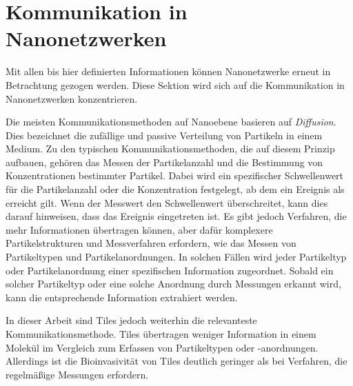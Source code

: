 \section{Kommunikation in Nanonetzwerken}

Mit allen bis hier definierten Informationen können Nanonetzwerke erneut in Betrachtung gezogen werden. Diese Sektion wird sich auf die Kommunikation in Nanonetzwerken konzentrieren.

Die meisten Kommunikationsmethoden auf Nanoebene basieren auf \emph{Diffusion}. Dies bezeichnet die zufällige und passive Verteilung von Partikeln in einem Medium. Zu den typischen Kommunikationsmethoden, die auf diesem Prinzip aufbauen, gehören das Messen der Partikelanzahl und die Bestimmung von Konzentrationen bestimmter Partikel.
Dabei wird ein spezifischer Schwellenwert für die Partikelanzahl oder die Konzentration festgelegt, ab dem ein Ereignis als erreicht gilt. 
Wenn der Messwert den Schwellenwert überschreitet, kann dies darauf hinweisen, dass das Ereignis eingetreten ist. Es gibt jedoch Verfahren, die mehr Informationen übertragen können, aber dafür komplexere Partikelstrukturen und Messverfahren erfordern, wie das Messen von Partikeltypen und Partikelanordnungen. In solchen Fällen wird jeder Partikeltyp oder Partikelanordnung einer spezifischen Information zugeordnet. Sobald ein solcher Partikeltyp oder eine solche Anordnung durch Messungen erkannt wird, kann die entsprechende Information extrahiert werden.

In dieser Arbeit sind Tiles jedoch weiterhin die relevanteste Kommunikationsmethode. Tiles übertragen weniger Information in einem Molekül im Vergleich zum Erfassen von Partikeltypen oder -anordnungen. Allerdings ist die Bioinvasivität von Tiles deutlich geringer als bei Verfahren, die regelmäßige Messungen erfordern.\cite{farsad2016survey}

